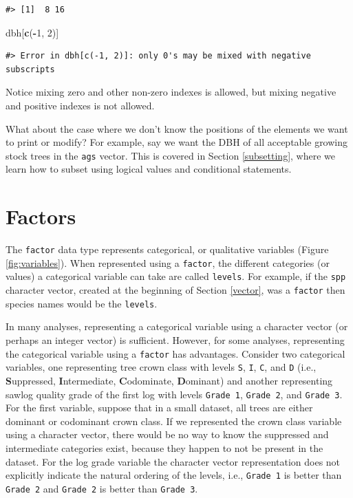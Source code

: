 \documentclass[
  11pt,
]{krantz}
\newenvironment{Shaded}{\begin{snugshade}}{\end{snugshade}}
\newcommand{\DecValTok}[1]{\textcolor[rgb]{0.00,0.00,0.81}{#1}}
\newcommand{\KeywordTok}[1]{\textcolor[rgb]{0.13,0.29,0.53}{\textbf{#1}}}
\newcommand{\NormalTok}[1]{#1}
\newcommand{\OperatorTok}[1]{\textcolor[rgb]{0.81,0.36,0.00}{\textbf{#1}}}
\theoremstyle{definition}
\theoremstyle{definition}
\theoremstyle{definition}
\theoremstyle{definition}
\theoremstyle{remark}
\begin{document}
\begin{verbatim}
#> [1]  8 16
\end{verbatim}

\begin{Shaded}
\begin{Highlighting}[]
\NormalTok{dbh[}\KeywordTok{c}\NormalTok{(}\OperatorTok{{-}}\DecValTok{1}\NormalTok{, }\DecValTok{2}\NormalTok{)]}
\end{Highlighting}
\end{Shaded}

\begin{verbatim}
#> Error in dbh[c(-1, 2)]: only 0's may be mixed with negative subscripts
\end{verbatim}

Notice mixing zero and other non-zero indexes is allowed, but mixing negative and positive indexes is not allowed.

What about the case where we don't know the positions of the elements we want to print or modify? For example, say we want the DBH of all acceptable growing stock trees in the \texttt{ags} vector. This is covered in Section \ref{subsetting}, where we learn how to subset using logical values and conditional statements.

\hypertarget{factors}{%
\section{Factors}\label{factors}}

The \texttt{factor} data type represents categorical, or qualitative variables (Figure \ref{fig:variables}). When represented using a \texttt{factor}, the different categories (or values) a categorical variable can take are called \texttt{levels}. For example, if the \texttt{spp} character vector, created at the beginning of Section \ref{vector}, was a \texttt{factor} then species names would be the \texttt{levels}.

In many analyses, representing a categorical variable using a character vector (or perhaps an integer vector) is sufficient. However, for some analyses, representing the categorical variable using a \texttt{factor} has advantages. Consider two categorical variables, one representing tree crown class with levels \texttt{S}, \texttt{I}, \texttt{C}, and \texttt{D} (i.e., \textbf{S}uppressed, \textbf{I}ntermediate, \textbf{C}odominate, \textbf{D}ominant) and another representing sawlog quality grade of the first log with levels \texttt{Grade\ 1}, \texttt{Grade\ 2}, and \texttt{Grade\ 3}. For the first variable, suppose that in a small dataset, all trees are either dominant or codominant crown class. If we represented the crown class variable using a character vector, there would be no way to know the suppressed and intermediate categories exist, because they happen to not be present in the dataset. For the log grade variable the character vector representation does not explicitly indicate the natural ordering of the levels, i.e., \texttt{Grade\ 1} is better than \texttt{Grade\ 2} and \texttt{Grade\ 2} is better than \texttt{Grade\ 3}.
\end{document}

